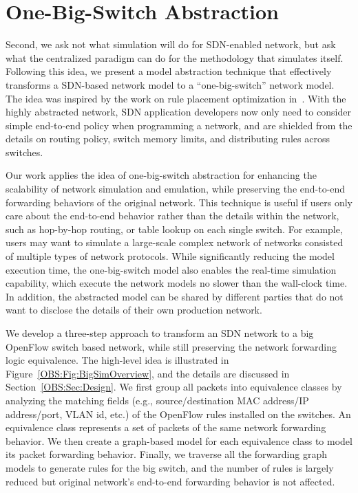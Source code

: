 \section{One-Big-Switch Abstraction}
\label{OBS:Sec:Intro}

Second, we ask not what simulation will do for SDN-enabled network, but ask what the centralized paradigm can do for the methodology that simulates itself.
Following this idea, we present a model abstraction technique that effectively transforms
a SDN-based network model to a ``one-big-switch'' network model.
The idea was inspired by the work on rule placement optimization in~\cite{OneBigSwitchAbstraction}.
With the highly abstracted network, SDN application developers now only need to consider
simple end-to-end policy when programming a network,
and are shielded from the details on routing policy, switch memory limits,
and distributing rules across switches.

Our work applies the idea of one-big-switch abstraction for enhancing the scalability
of network simulation and emulation, while preserving the end-to-end forwarding behaviors of the original network.
This technique is useful if users only care about the end-to-end behavior rather than
the details within the network, such as hop-by-hop routing, or table lookup on each single switch.
For example, users may want to simulate a large-scale complex network of networks consisted of multiple types of network protocols.
While significantly reducing the model execution time, the one-big-switch model also enables the real-time simulation capability,
which execute the network models no slower than the wall-clock time.
In addition, the abstracted model can be shared by different parties that do not want to disclose the details
of their own production network.

We develop a three-step approach to transform an SDN network to a big OpenFlow switch based network,
while still preserving the network forwarding logic equivalence.
The high-level idea is illustrated in Figure~\ref{OBS:Fig:BigSimOverview},
and the details are discussed in Section~\ref{OBS:Sec:Design}.
We first group all packets into equivalence classes by analyzing the matching fields
(e.g., source/destination MAC address/IP address/port, VLAN id, etc.)
of the OpenFlow rules installed on the switches.
An equivalence class represents a set of packets of the same network forwarding behavior.
We then create a graph-based model for each equivalence class to model its packet forwarding behavior.
Finally, we traverse all the forwarding graph models to generate rules for the big switch,
and the number of rules is largely reduced but original network's end-to-end forwarding behavior is not affected.

